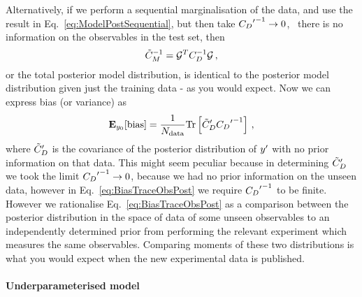 Alternatively, if we perform a sequential marginalisation of
the data, and use the result in Eq.~\ref{eq:ModelPostSequential}, but
then take ${{C_{D}}^{\prime}}^{-1} \to 0$, \ie\ there is no information
on the observables in the test set, then
\begin{equation}
    \tilde{C}_M^{-1} = \mathcal{G}^T C_{D}^{-1} \mathcal{G} \, ,
\end{equation}
or the total posterior model distribution, is identical to the posterior model
distribution given just the training data - as you would expect.
Now we can express bias (or variance) as
\begin{equation}\label{eq:BiasTraceObsPost}
    \mathbf{E}_{y_0}[{\rm bias}] = \frac{1}{N_{\rm data}}
    {\rm Tr} \left[
        {{\tilde{C}_D}^{\prime}}
        {{C_{D}}^{\prime}}^{-1}
    \right] \, ,
\end{equation}
where ${{\tilde{C}_D}^{\prime}}$ is the covariance of the posterior distribution of
${{y}^{\prime}}$ with no prior information on that data. This might seem peculiar
because in determining ${{\tilde{C}_D}^{\prime}}$ we took the limit
${{C_{D}}^{\prime}}^{-1} \to 0$, because we had no prior information on the
unseen data, however
in Eq.~\ref{eq:BiasTraceObsPost} we require
${{C_{D}}^{\prime}}^{-1}$ to be finite.
However
we rationalise Eq.~\ref{eq:BiasTraceObsPost} as a comparison between
the posterior distribution in the space of data of some unseen observables to an
independently determined prior from performing the relevant experiment which
measures the same observables. Comparing moments of these two distributions
is what you would expect when the new experimental data is published.


\paragraph{Underparameterised model}

